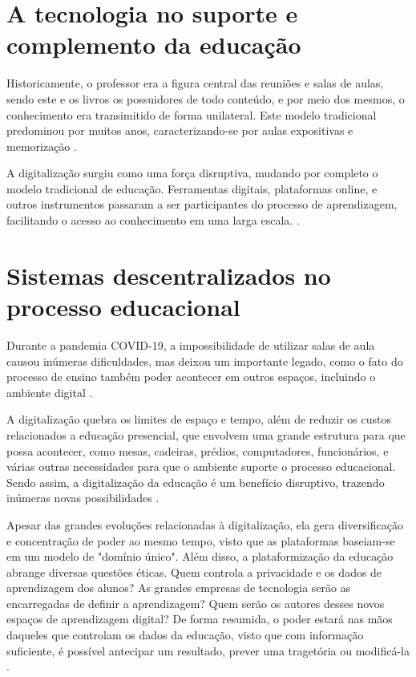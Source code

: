 \section{A tecnologia no suporte e complemento da educação}
Historicamente, o professor era a figura central das reuniões e salas de aulas, sendo este e os livros os possuidores de todo conteúdo, e por meio dos mesmos, o conhecimento era transimitido de forma unilateral. Este modelo tradicional predominou por muitos anos, caracterizando-se por aulas expositivas e memorização \cite{unicep2024}.

A digitalização surgiu como uma força disruptiva, mudando por completo o modelo tradicional de educação. Ferramentas digitais, plataformas online, e outros instrumentos passaram a ser participantes do processo de aprendizagem, facilitando o acesso ao conhecimento em uma larga escala. \cite{unicep2024}.

\section{Sistemas descentralizados no processo educacional}
Durante a pandemia COVID-19, a impossibilidade de utilizar salas de aula causou inúmeras dificuldades, mas deixou um importante legado, como o fato do processo de ensino também poder acontecer em outros espaços, incluindo o ambiente digital \cite{valente2022}.

A digitalização quebra os limites de espaço e tempo, além de reduzir os custos relacionados a educação presencial, que envolvem uma grande estrutura para que possa acontecer, como mesas, cadeiras, prédios, computadores, funcionários, e várias outras necessidades para que o ambiente suporte o processo educacional. Sendo assim, a digitalização da educação é um benefício disruptivo, trazendo inúmeras novas possibilidades \cite{valente2022}.

Apesar das grandes evoluções relacionadas à digitalização, ela gera diversificação e concentração de poder ao mesmo tempo, visto que as plataformas baseiam-se em um modelo de "domínio único". Além disso, a plataformização da educação abrange diversas questões éticas. Quem controla a privacidade e os dados de aprendizagem dos alunos? As grandes empresas de tecnologia serão as encarregadas de definir a aprendizagem? Quem serão os autores desses novos espaços de aprendizagem digital? De forma resumida, o poder estará nas mãos daqueles que controlam os dados da educação, visto que com informação suficiente, é possível antecipar um resultado, prever uma tragetória ou modificá-la \cite{valente2022}.

